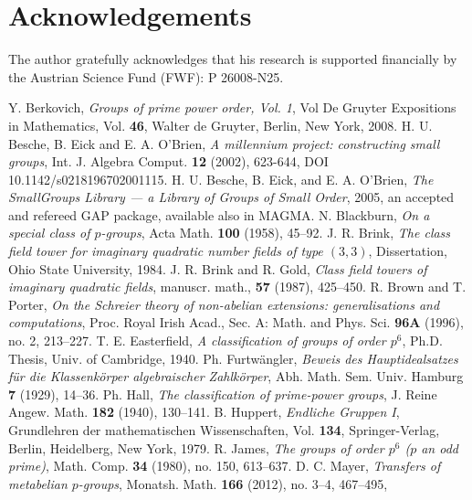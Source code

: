 \documentclass{amsart}
\theoremstyle{definition}
\numberwithin{equation}{section}
\begin{document}
\section{Acknowledgements}
\label{s:Thanks}

The author gratefully acknowledges that his research is supported financially
by the Austrian Science Fund (FWF): P 26008-N25.



\begin{thebibliography}{XX}
Y. Berkovich,
\textit{Groups of prime power order, Vol. 1},
Vol
De Gruyter Expositions in Mathematics,
Vol. \textbf{46},
Walter de Gruyter, Berlin, New York,
2008.
H. U. Besche, B. Eick and E. A. O'Brien,
\textit{A millennium project: constructing small groups},
Int. J. Algebra Comput.
\textbf{12}
(2002),
623-644,
DOI 10.1142/s0218196702001115.
H. U. Besche, B. Eick, and E. A. O'Brien,
\textit{The SmallGroups Library --- a Library of Groups of Small Order},
2005,
an accepted and refereed GAP package, available also in MAGMA.
N. Blackburn,
\textit{On a special class of \(p\)-groups},
Acta Math.
\textbf{100}
(1958),
45--92.
J. R. Brink,
\textit{The class field tower for imaginary quadratic number fields
of type \((3,3)\)},
Dissertation,
Ohio State University,
1984.
J. R. Brink and R. Gold,
\textit{Class field towers of imaginary quadratic fields},
manuscr. math.,
\textbf{57}
(1987),
425--450.
R. Brown and T. Porter,
\textit{On the Schreier theory of non-abelian extensions: generalisations and computations},
Proc. Royal Irish Acad.,
Sec. A: Math. and Phys. Sci.
\textbf{96A}
(1996),
no. 2,
213--227.
T. E. Easterfield,
\textit{A classification of groups of order \(p^6\)},
Ph.D. Thesis,
Univ. of Cambridge,
1940.
Ph. Furtw\"angler,
\textit{Beweis des Hauptidealsatzes f\"ur die Klassenk\"orper algebraischer Zahlk\"orper},
Abh. Math. Sem. Univ. Hamburg
\textbf{7}
(1929),
14--36.
Ph. Hall,
\textit{The classification of prime-power groups},
J. Reine Angew. Math.
\textbf{182}
(1940),
130--141.
B. Huppert,
\textit{Endliche Gruppen I},
Grundlehren der mathematischen Wissenschaften,
Vol. \textbf{134},
Springer-Verlag, Berlin, Heidelberg, New York,
1979.
R. James,
\textit{The groups of order \(p^6\) (\(p\) an odd prime)},
Math. Comp.
\textbf{34}
(1980),
no. 150,
613--637.
D. C. Mayer,
\textit{Transfers of metabelian \(p\)-groups},
Monatsh. Math.
\textbf{166}
(2012),
no. 3--4,
467--495,

\end{thebibliography}
\end{document}
